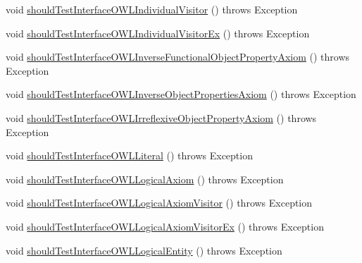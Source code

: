 \begin{DoxyCompactItemize}
void \hyperlink{classorg_1_1semanticweb_1_1owlapi_1_1contract_1_1_contract_owlapi_model__2_test_ac9efe38cbd0fe06409e29fd1d65a8946}{should\-Test\-Interface\-O\-W\-L\-Individual\-Visitor} ()  throws Exception 
\item 
void \hyperlink{classorg_1_1semanticweb_1_1owlapi_1_1contract_1_1_contract_owlapi_model__2_test_a23bea58125107a0cff67951d7beb0107}{should\-Test\-Interface\-O\-W\-L\-Individual\-Visitor\-Ex} ()  throws Exception 
\item 
void \hyperlink{classorg_1_1semanticweb_1_1owlapi_1_1contract_1_1_contract_owlapi_model__2_test_a2f54ce2ecfeac79a5fad7eda8e6cd8ed}{should\-Test\-Interface\-O\-W\-L\-Inverse\-Functional\-Object\-Property\-Axiom} ()  throws Exception 
\item 
void \hyperlink{classorg_1_1semanticweb_1_1owlapi_1_1contract_1_1_contract_owlapi_model__2_test_ac16bc39b66b273f64e5c1e15694cecc7}{should\-Test\-Interface\-O\-W\-L\-Inverse\-Object\-Properties\-Axiom} ()  throws Exception 
\item 
void \hyperlink{classorg_1_1semanticweb_1_1owlapi_1_1contract_1_1_contract_owlapi_model__2_test_acc43d86b05a3396f9bf754b389f4fe21}{should\-Test\-Interface\-O\-W\-L\-Irreflexive\-Object\-Property\-Axiom} ()  throws Exception 
\item 
void \hyperlink{classorg_1_1semanticweb_1_1owlapi_1_1contract_1_1_contract_owlapi_model__2_test_a3349e38b0cd88c21285b1cd1ef2f759f}{should\-Test\-Interface\-O\-W\-L\-Literal} ()  throws Exception 
\item 
void \hyperlink{classorg_1_1semanticweb_1_1owlapi_1_1contract_1_1_contract_owlapi_model__2_test_aa31ce8fa56ef5743453df140ea657d6c}{should\-Test\-Interface\-O\-W\-L\-Logical\-Axiom} ()  throws Exception 
\item 
void \hyperlink{classorg_1_1semanticweb_1_1owlapi_1_1contract_1_1_contract_owlapi_model__2_test_ae338f3d5fdfa2f2c7e4824efe3efe063}{should\-Test\-Interface\-O\-W\-L\-Logical\-Axiom\-Visitor} ()  throws Exception 
\item 
void \hyperlink{classorg_1_1semanticweb_1_1owlapi_1_1contract_1_1_contract_owlapi_model__2_test_a85a9b0ddc1e4b85f891bcfb11fb6ef13}{should\-Test\-Interface\-O\-W\-L\-Logical\-Axiom\-Visitor\-Ex} ()  throws Exception 
\item 
void \hyperlink{classorg_1_1semanticweb_1_1owlapi_1_1contract_1_1_contract_owlapi_model__2_test_a24609c4b4fba701aeff60524bb721e84}{should\-Test\-Interface\-O\-W\-L\-Logical\-Entity} ()  throws Exception 
\item 

\end{DoxyCompactItemize}
